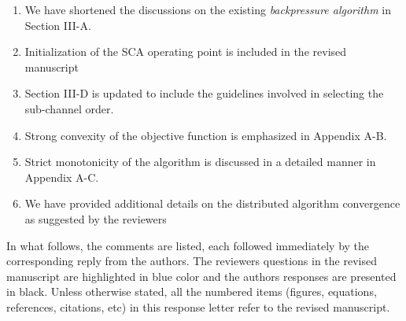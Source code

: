 \begin{enumerate}
\item We have shortened the discussions on the existing \textit{backpressure algorithm} in Section III-A.
\item Initialization of the \ac{SCA} operating point is included in the revised manuscript
\item Section III-D is updated to include the guidelines involved in selecting the sub-channel order.
\item Strong convexity of the objective function is emphasized in Appendix A-B.
\item Strict monotonicity of the algorithm is discussed in a detailed manner in Appendix A-C.
\item We have provided additional details on the distributed algorithm convergence as suggested by the reviewers
\end{enumerate}

In what follows, the comments are listed, each followed immediately by the corresponding reply from the authors. The reviewers questions in the revised manuscript are highlighted in blue color and the authors responses are presented in black. Unless otherwise stated, all the numbered items (figures, equations, references, citations, etc) in this response letter refer to the revised manuscript.